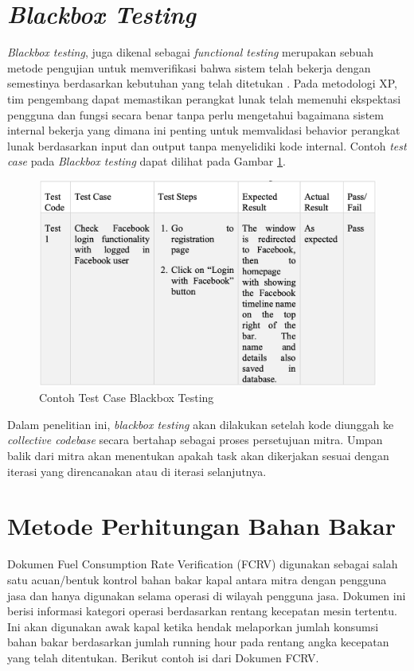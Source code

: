 \section{\textit{Blackbox Testing}}
\textit{Blackbox testing}, juga dikenal sebagai \textit{functional testing} merupakan sebuah metode pengujian untuk memverifikasi bahwa sistem telah bekerja dengan semestinya berdasarkan kebutuhan yang telah ditetukan \parencite{article:noerlina}. Pada metodologi XP, tim pengembang dapat memastikan perangkat lunak telah memenuhi ekspektasi pengguna dan fungsi secara benar tanpa perlu mengetahui bagaimana sistem internal bekerja yang dimana ini penting untuk memvalidasi behavior perangkat lunak berdasarkan input dan output tanpa menyelidiki kode internal. Contoh \textit{test case} pada \textit{Blackbox testing} dapat dilihat pada Gambar \ref{fig:blackbox-example}.

\begin{figure}[!h]
    \includegraphics[width=.8\linewidth, center]{images/tinjauan-pustaka/fig-blackbox-eg.png}
    \caption{Contoh Test Case Blackbox Testing \parencite{ thesis:rahman}}
    \label{fig:blackbox-example}
\end{figure}

Dalam penelitian ini, \textit{blackbox testing} akan dilakukan setelah kode diunggah ke \textit{collective codebase} secara bertahap sebagai proses persetujuan mitra. Umpan balik dari mitra akan menentukan apakah task akan dikerjakan sesuai dengan iterasi yang direncanakan atau di iterasi selanjutnya.

\newpage

\section{Metode Perhitungan Bahan Bakar}\label{sec:fcrv}

Dokumen Fuel Consumption Rate Verification (FCRV) digunakan sebagai salah satu acuan/bentuk kontrol bahan bakar kapal antara mitra dengan pengguna jasa dan hanya digunakan selama operasi di wilayah pengguna jasa. Dokumen ini berisi informasi kategori operasi berdasarkan rentang kecepatan mesin tertentu. Ini akan digunakan awak kapal ketika hendak melaporkan jumlah konsumsi bahan bakar berdasarkan jumlah running hour pada rentang angka kecepatan yang telah ditentukan. Berikut contoh isi dari Dokumen FCRV.

